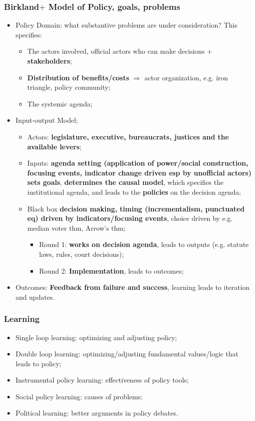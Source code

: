 \documentclass[aspectratio=169]{beamer}
\theoremstyle{principle}
\begin{document}
\begin{frame}
\frametitle{Birkland$+$ Model of Policy, goals, problems}
\begin{itemize}
\item Policy Domain: what substantive problems are under consideration?  This specifies:
\begin{itemize}
\item The actors involved, official actors who can make decisions $+$ \textbf{stakeholders}; 
\item \textbf{Distribution of benefits/costs} $\Rightarrow$ actor organization, e.g. iron triangle, policy community;
\item The systemic agenda; 
\end{itemize}
\bigskip
\item \color{black}Input-output Model;
\begin{itemize}
\item Actors: \textbf{legislature, executive, bureaucrats, justices and the available levers};
\item Inputs: \textbf{agenda setting (application of power/social construction, focusing events, indicator change driven esp by unofficial actors)} \textbf{sets goals}, \textbf{determines the causal model}, which specifies the institutional agenda, and leads to the \textbf{policies} on the decision agenda;
\item Black box \textbf{decision making, timing (incrementalism, punctuated eq) driven by indicators/focusing events}, choice driven by e.g. median voter thm, Arrow's thm;
\begin{itemize}
\item Round 1: \textbf{works on decision agenda}, leads to outputs (e.g. statute laws, rules, court decisions);
\item Round 2: \textbf{Implementation}, leads to outcomes;
 \end{itemize}
\end{itemize}
\bigskip
\item Outcomes: \textbf{Feedback from failure and success}, learning leads to iteration and updates.
\end{itemize}
\end{frame}

\begin{frame}
\frametitle{Learning}

\begin{itemize}
\item Single loop learning: optimizing and adjusting policy;
\bigskip
\item Double loop learning: optimizing/adjusting fundamental values/logic that leads to policy;
\bigskip
\item Instrumental policy learning: effectiveness of policy tools;
\bigskip
\item Social policy learning: causes of problems;
\bigskip
\item Political learning: better arguments in policy debates.
\end{itemize}

\end{frame}
\end{document}
